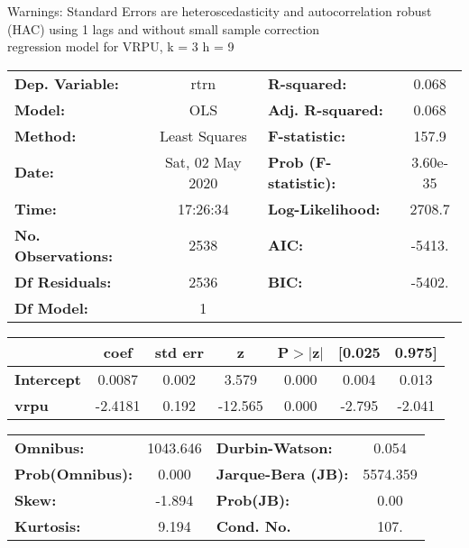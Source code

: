 Warnings: \newline
 [1] Standard Errors are heteroscedasticity and autocorrelation robust (HAC) using 1 lags and without small sample correction\\ 

regression model for VRPU, k = 3 h = 9\begin{center}
\begin{tabular}{lclc}
\toprule
\textbf{Dep. Variable:}    &       rtrn       & \textbf{  R-squared:         } &     0.068   \\
\textbf{Model:}            &       OLS        & \textbf{  Adj. R-squared:    } &     0.068   \\
\textbf{Method:}           &  Least Squares   & \textbf{  F-statistic:       } &     157.9   \\
\textbf{Date:}             & Sat, 02 May 2020 & \textbf{  Prob (F-statistic):} &  3.60e-35   \\
\textbf{Time:}             &     17:26:34     & \textbf{  Log-Likelihood:    } &    2708.7   \\
\textbf{No. Observations:} &        2538      & \textbf{  AIC:               } &    -5413.   \\
\textbf{Df Residuals:}     &        2536      & \textbf{  BIC:               } &    -5402.   \\
\textbf{Df Model:}         &           1      & \textbf{                     } &             \\
\bottomrule
\end{tabular}
\begin{tabular}{lcccccc}
                   & \textbf{coef} & \textbf{std err} & \textbf{z} & \textbf{P$> |$z$|$} & \textbf{[0.025} & \textbf{0.975]}  \\
\midrule
\textbf{Intercept} &       0.0087  &        0.002     &     3.579  &         0.000        &        0.004    &        0.013     \\
\textbf{vrpu}      &      -2.4181  &        0.192     &   -12.565  &         0.000        &       -2.795    &       -2.041     \\
\bottomrule
\end{tabular}
\begin{tabular}{lclc}
\textbf{Omnibus:}       & 1043.646 & \textbf{  Durbin-Watson:     } &    0.054  \\
\textbf{Prob(Omnibus):} &   0.000  & \textbf{  Jarque-Bera (JB):  } & 5574.359  \\
\textbf{Skew:}          &  -1.894  & \textbf{  Prob(JB):          } &     0.00  \\
\textbf{Kurtosis:}      &   9.194  & \textbf{  Cond. No.          } &     107.  \\
\bottomrule
\end{tabular}
\end{center}

